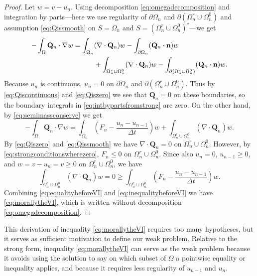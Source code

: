 \documentclass[final,leqno,onefignum,onetabnum]{siamltex1213bueler}
\newcommand\bn{\mathbf{n}}
\newcommand\bQ{\mathbf{Q}}
\newcommand{\Div}{\nabla\cdot}
\renewcommand{\grad}{\nabla}
\begin{document}
\begin{proof}  Let $w=v-u_n$.  Using decomposition \eqref{eq:omegadecomposition} and integration by parts---here we use regularity of $\partial \Omega_n$ and $\partial(\Omega_n^r \cup \Omega_n^0)$ and assumption \eqref{eq:Qissmooth} on $S=\Omega_n$ and $S=(\Omega_n^r \cup \Omega_n^0)^\circ$---we get
\begin{align}
-\int_{\Omega} \bQ_n \cdot \grad w &= \int_{\Omega_n} (\Div \bQ_n) w - \int_{\partial \Omega_n} (\bQ_n \cdot \bn) w \label{eq:intbypartsfromstrong} \\
  &\qquad\quad + \int_{\Omega_n^r \cup \Omega_n^0} (\Div \bQ_n) w - \int_{\partial(\Omega_n^r \cup \Omega_n^0)} (\bQ_n \cdot \bn) w. \notag
\end{align}
Because $u_n$ is continuous, $u_n=0$ on $\partial \Omega_n$ and $\partial(\Omega_n^r \cup \Omega_n^0)$.  Thus by \eqref{eq:Qiscontinuous} and \eqref{eq:Qiszero} we see that $\bQ_n=0$ on these boundaries, so the boundary integrals in \eqref{eq:intbypartsfromstrong} are zero.  On the other hand, by \eqref{eq:semimassconserve} we get
\begin{equation}
-\int_{\Omega} \bQ_n \cdot \grad w = \int_{\Omega_n} \left(F_n - \frac{u_n - u_{n-1}}{\Delta t}\right) w + \int_{\Omega_n^r \cup \Omega_n^0} (\Div \bQ_n) w. \label{eq:equalitybeforeVI}
\end{equation}
By \eqref{eq:Qiszero} and \eqref{eq:Qissmooth} we have $\Div \bQ_n=0$ on $\Omega_n^r \cup \Omega_n^0$.  However, by \eqref{eq:strongconditionswherezero}, $F_n \le 0$ on $\Omega_n^r \cup \Omega_n^0$.  Since also $u_n=0$, $u_{n-1}\ge 0$, and $w = v-u_n = v \ge 0$ on $\Omega_n^r \cup \Omega_n^0$, we have
\begin{equation}
    \int_{\Omega_n^r \cup \Omega_n^0} (\Div \bQ_n) w = 0 \ge \int_{\Omega_n^r \cup \Omega_n^0} \left(F_n - \frac{u_n - u_{n-1}}{\Delta t}\right) w. \label{eq:inequalitybeforeVI}
\end{equation}
Combining \eqref{eq:equalitybeforeVI} and \eqref{eq:inequalitybeforeVI} we have \eqref{eq:morallytheVI}, which is written without decomposition \eqref{eq:omegadecomposition}.
\end{proof}

\medskip
This derivation of inequality \eqref{eq:morallytheVI} requires too many hypotheses, but it serves as sufficient motivation to define our weak problem.  Relative to the strong form, inequality \eqref{eq:morallytheVI} can serve as the weak problem because it avoids using the solution to say on which subset of $\Omega$ a pointwise equality or inequality applies, and because it requires less regularity of $u_{n-1}$ and $u_n$.
\end{document}
